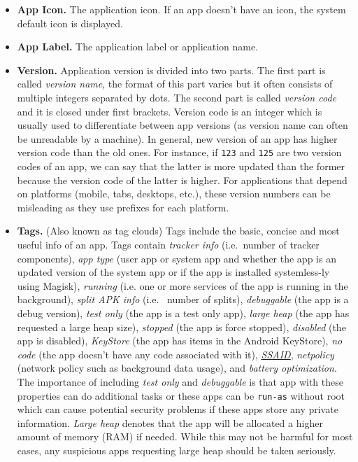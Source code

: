 \begin{itemize}
    \item \textbf{App Icon.} The application icon. If an app doesn't have an icon, the system default icon is displayed.

    \item \textbf{App Label.} The application label or application name.

    \item \textbf{Version.} Application version is divided into two parts. The first part is called \textit{version
    name}, the format of this part varies but it often consists of multiple integers separated by dots. The second part
    is called \textit{version code} and it is closed under first brackets. Version code is an integer which is usually
    used to differentiate between app versions (as version name can often be unreadable by a machine). In general, new
    version of an app has higher version code than the old ones. For instance, if \texttt{123} and \texttt{125} are two
    version codes of an app, we can say that the latter is more updated than the former because the version code of the
    latter is higher. For applications that depend on platforms (mobile, tabs, desktops, etc.), these version numbers
    can be misleading as they use prefixes for each platform.

    \item \textbf{Tags.} (Also known as tag clouds) Tags include the basic, concise and most useful info of an app.
    Tags contain \textit{tracker info} (i.e.\ number of tracker components), \textit{app type} (user app or system app
    and whether the app is an updated version of the system app or if the app is installed systemless-ly using Magisk),
    \textit{running} (i.e. one or more services of the app is running in the background), \textit{split APK info} (i.e.
    \ number of splits), \textit{debuggable} (the app is a debug version), \textit{test only} (the app is a test only
    app), \textit{large heap} (the app has requested a large heap size), \textit{stopped} (the app is force stopped),
    \textit{disabled} (the app is disabled), \textit{KeyStore} (the app has items in the Android KeyStore),
    \textit{no code} (the app doesn't have any code associated with it), \hyperref[sec:terminologies]{\textit{SSAID}},
    \textit{netpolicy} (network policy such as background data usage), and \textit{battery optimization}.
    The importance of including \textit{test only} and \textit{debuggable} is that app with these properties can do
    additional tasks or these apps can be \texttt{run-as} without root which can cause potential security problems
    if these apps store any private information.
    \textit{Large heap} denotes that the app will be allocated a higher amount of memory (RAM) if needed.
    While this may not be harmful for most cases, any suspicious apps requesting large heap should be taken seriously.


\end{itemize}
